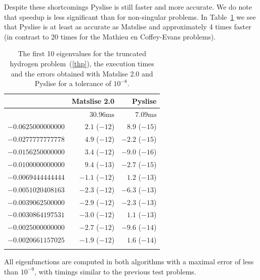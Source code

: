 Despite these shortcomings Pyslise is still faster and more accurate. We do note that speedup is less significant than for non-singular problems. In Table~\ref{tab:c2_tab7} we see that Pyslise is at least as accurate as Matslise and approximately 4 times faster (in contrast to 20 times for the Mathieu en Coffey-Evans problems).

\begin{table}
  \begin{center}
    \begin{tabular}[]{rrr}
      \toprule
                         & Matslise 2.0     & Pyslise         \\
      \midrule
                         & $30.96\text{ms}$ & $7.09\text{ms}$ \\
      $-0.0625000000000$ & $2.1$ ($-12$)    & $8.9$ ($-15$)   \\
      $-0.0277777777778$ & $4.9$ ($-12$)    & $-2.2$ ($-15$)  \\
      $-0.0156250000000$ & $3.4$ ($-12$)    & $-9.0$ ($-16$)  \\
      $-0.0100000000000$ & $9.4$ ($-13$)    & $-2.7$ ($-15$)  \\
      $-0.0069444444444$ & $-1.1$ ($-12$)   & $1.2$ ($-13$)   \\
      $-0.0051020408163$ & $-2.3$ ($-12$)   & $-6.3$ ($-13$)  \\
      $-0.0039062500000$ & $-2.9$ ($-12$)   & $-2.3$ ($-13$)  \\
      $-0.0030864197531$ & $-3.0$ ($-12$)   & $1.1$ ($-13$)   \\
      $-0.0025000000000$ & $-2.7$ ($-12$)   & $-9.6$ ($-14$)  \\
      $-0.0020661157025$ & $-1.9$ ($-12$)   & $1.6$ ($-14$)   \\
                         &                  &                 \\
      \bottomrule
    \end{tabular}
    \caption{\label{tab:c2_tab7}The first 10 eigenvalues for the truncated hydrogen problem~(\ref{thp}),
      the execution times and the errors obtained with Matslise 2.0 and Pyslise for a tolerance of $10^{-8}$.  }
  \end{center}
\end{table}

All eigenfunctions are computed in both algorithms with a maximal error of less than $10^{-9}$, with timings similar to the previous test problems.

\stopchapter
